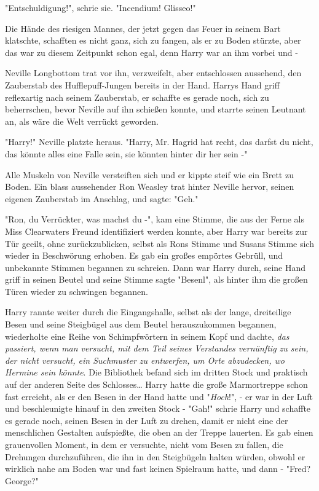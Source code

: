 {"Entschuldigung!", schrie sie. "Incendium! Glisseo!"

Die Hände des riesigen Mannes, der jetzt gegen das Feuer in seinem Bart klatschte, schafften es nicht ganz, sich zu fangen, als er zu Boden stürzte, aber das war zu diesem Zeitpunkt schon egal, denn Harry war an ihm vorbei und -

Neville Longbottom trat vor ihn, verzweifelt, aber entschlossen aussehend, den Zauberstab des Hufflepuff-Jungen bereits in der Hand. Harrys Hand griff reflexartig nach seinem Zauberstab, er schaffte es gerade noch, sich zu beherrschen, bevor Neville auf ihn schießen konnte, und starrte seinen Leutnant an, als wäre die Welt verrückt geworden.

"Harry!" Neville platzte heraus. "Harry, Mr. Hagrid hat recht, das darfst du nicht, das könnte alles eine Falle sein, sie könnten hinter dir her sein -"

Alle Muskeln von Neville versteiften sich und er kippte steif wie ein Brett zu Boden. Ein blass aussehender Ron Weasley trat hinter Neville hervor, seinen eigenen Zauberstab im Anschlag, und sagte: "Geh."

"Ron, du Verrückter, was machst du -", kam eine Stimme, die aus der Ferne als Miss Clearwaters Freund identifiziert werden konnte, aber Harry war bereits zur Tür geeilt, ohne zurückzublicken, selbst als Rons Stimme und Susans Stimme sich wieder in Beschwörung erhoben. Es gab ein großes empörtes Gebrüll, und unbekannte Stimmen begannen zu schreien. Dann war Harry durch, seine Hand griff in seinen Beutel und seine Stimme sagte "Besenl", als hinter ihm die großen Türen wieder zu schwingen begannen.

Harry rannte weiter durch die Eingangshalle, selbst als der lange, dreiteilige Besen und seine Steigbügel aus dem Beutel herauszukommen begannen, wiederholte eine Reihe von Schimpfwörtern in seinem Kopf und dachte, \emph{das passiert, wenn man versucht, mit dem Teil seines Verstandes vernünftig zu sein, der nicht versucht, ein Suchmuster zu entwerfen, um Orte abzudecken, wo Hermine sein könnte}. Die Bibliothek befand sich im dritten Stock und praktisch auf der anderen Seite des Schlosses… Harry hatte die große Marmortreppe schon fast erreicht, als er den Besen in der Hand hatte und "\emph{Hoch}!", - er war in der Luft und beschleunigte hinauf in den zweiten Stock - "Gah!" schrie Harry und schaffte es gerade noch, seinen Besen in der Luft zu drehen, damit er nicht eine der menschlichen Gestalten aufspießte, die oben an der Treppe lauerten. Es gab einen grauenvollen Moment, in dem er versuchte, nicht vom Besen zu fallen, die Drehungen durchzuführen, die ihn in den Steigbügeln halten würden, obwohl er wirklich nahe am Boden war und fast keinen Spielraum hatte, und dann - "Fred? George?"

}
